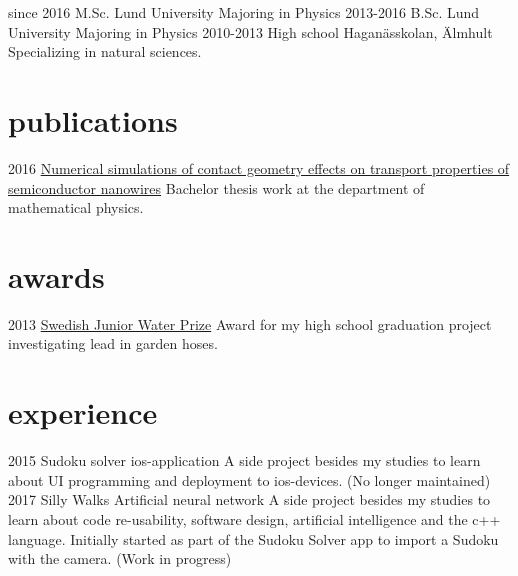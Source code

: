 \documentclass[]{twentysecondcv}
\begin{document}
\begin{twenty}
 \twentyitem
    {since 2016}
    {M.Sc.}
    {Lund University}
    {Majoring in Physics}
  \twentyitem
    {2013-2016}
    {B.Sc.}
    {Lund University}
    {Majoring in Physics}
  \twentyitem
    {2010-2013}
    {High school}
    {Hagan\"asskolan, \"Almhult}
    {Specializing in natural sciences.}
\end{twenty}


\section{publications}

\begin{twentyshort}
  \twentyitemshort
  {2016}
  {\href{http://lup.lub.lu.se/student-papers/record/8878322}{Numerical simulations of contact geometry
    effects on transport properties of semiconductor nanowires}
  Bachelor thesis work at the department of mathematical physics.}
\end{twentyshort}


\section{awards}

\begin{twentyshort}
  \twentyitemshort
    {2013}
    {\href{http://www.siwi.org/latest/vinner-2013-ars-svenska-confidantes/}{Swedish
      Junior Water Prize} Award for my high school graduation project
    investigating lead in garden hoses.}
\end{twentyshort}


\section{experience}

\begin{twenty}
  \twentyitem
    {2015}
    {Sudoku solver}
    {ios-application}
    {A side project besides my studies to learn about UI programming
      and deployment to ios-devices. (No longer maintained)}
\twentyitem
    {2017}
    {Silly Walks}
    {Artificial neural network}
    {A side project besides my studies to learn about code
      re-usability, software design, artificial intelligence and
      the c++ language. Initially started as part of the Sudoku Solver
    app to import a Sudoku with the camera. (Work in progress)}
\end{twenty}
\end{document}
